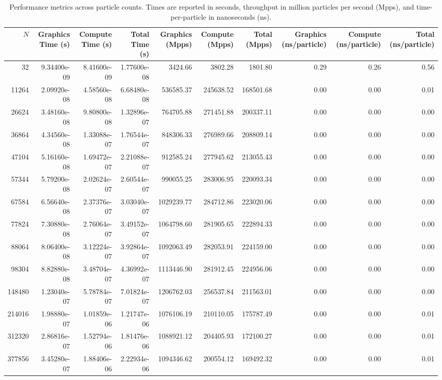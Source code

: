 \begin{table*}[htbp]
\centering
\caption{Performance metrics across particle counts. Times are reported in seconds, throughput in million particles per second (Mpps), and time-per-particle in nanoseconds (ns).}
\begin{tabular}{r r r r r r r r r r}
\hline
$N$ & Graphics Time (s) & Compute Time (s) & Total Time (s) & Graphics (Mpps) & Compute (Mpps) & Total (Mpps) & Graphics (ns/particle) & Compute (ns/particle) & Total (ns/particle) \\
\hline
32 & 9.34400e-09 & 8.41600e-09 & 1.77600e-08 & 3424.66 & 3802.28 & 1801.80 & 0.29 & 0.26 & 0.56 \\
11264 & 2.09920e-08 & 4.58560e-08 & 6.68480e-08 & 536585.37 & 245638.52 & 168501.68 & 0.00 & 0.00 & 0.01 \\
26624 & 3.48160e-08 & 9.80800e-08 & 1.32896e-07 & 764705.88 & 271451.88 & 200337.11 & 0.00 & 0.00 & 0.00 \\
36864 & 4.34560e-08 & 1.33088e-07 & 1.76544e-07 & 848306.33 & 276989.66 & 208809.14 & 0.00 & 0.00 & 0.00 \\
47104 & 5.16160e-08 & 1.69472e-07 & 2.21088e-07 & 912585.24 & 277945.62 & 213055.43 & 0.00 & 0.00 & 0.00 \\
57344 & 5.79200e-08 & 2.02624e-07 & 2.60544e-07 & 990055.25 & 283006.95 & 220093.34 & 0.00 & 0.00 & 0.00 \\
67584 & 6.56640e-08 & 2.37376e-07 & 3.03040e-07 & 1029239.77 & 284712.86 & 223020.06 & 0.00 & 0.00 & 0.00 \\
77824 & 7.30880e-08 & 2.76064e-07 & 3.49152e-07 & 1064798.60 & 281905.65 & 222894.33 & 0.00 & 0.00 & 0.00 \\
88064 & 8.06400e-08 & 3.12224e-07 & 3.92864e-07 & 1092063.49 & 282053.91 & 224159.00 & 0.00 & 0.00 & 0.00 \\
98304 & 8.82880e-08 & 3.48704e-07 & 4.36992e-07 & 1113446.90 & 281912.45 & 224956.06 & 0.00 & 0.00 & 0.00 \\
148480 & 1.23040e-07 & 5.78784e-07 & 7.01824e-07 & 1206762.03 & 256537.84 & 211563.01 & 0.00 & 0.00 & 0.00 \\
214016 & 1.98880e-07 & 1.01859e-06 & 1.21747e-06 & 1076106.19 & 210110.05 & 175787.49 & 0.00 & 0.00 & 0.01 \\
312320 & 2.86816e-07 & 1.52794e-06 & 1.81476e-06 & 1088921.12 & 204405.93 & 172100.27 & 0.00 & 0.00 & 0.01 \\
377856 & 3.45280e-07 & 1.88406e-06 & 2.22934e-06 & 1094346.62 & 200554.12 & 169492.32 & 0.00 & 0.00 & 0.01 \\

\end{tabular}
\end{table*}
